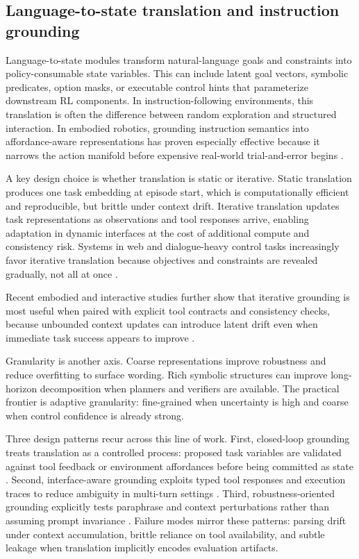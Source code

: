 ﻿\documentclass[conference]{IEEEtran}
\begin{document}
\subsection{Language-to-state translation and instruction grounding}
Language-to-state modules transform natural-language goals and constraints into policy-consumable state variables. This can include latent goal vectors, symbolic predicates, option masks, or executable control hints that parameterize downstream RL components. In instruction-following environments, this translation is often the difference between random exploration and structured interaction. In embodied robotics, grounding instruction semantics into affordance-aware representations has proven especially effective because it narrows the action manifold before expensive real-world trial-and-error begins \cite{arxiv_p_2204_01691,doi_p_10_1109_icra48891_2023_10160591,arxiv_p_2310_17722}.

A key design choice is whether translation is static or iterative. Static translation produces one task embedding at episode start, which is computationally efficient and reproducible, but brittle under context drift. Iterative translation updates task representations as observations and tool responses arrive, enabling adaptation in dynamic interfaces at the cost of additional compute and consistency risk. Systems in web and dialogue-heavy control tasks increasingly favor iterative translation because objectives and constraints are revealed gradually, not all at once \cite{arxiv_p_2311_00262,arxiv_p_2402_19446,arxiv_p_2601_02439}.

Recent embodied and interactive studies further show that iterative grounding is most useful when paired with explicit tool contracts and consistency checks, because unbounded context updates can introduce latent drift even when immediate task success appears to improve \cite{arxiv_p_2404_03648,arxiv_p_2511_14460,arxiv_p_2601_03555}.

Granularity is another axis. Coarse representations improve robustness and reduce overfitting to surface wording. Rich symbolic structures can improve long-horizon decomposition when planners and verifiers are available. The practical frontier is adaptive granularity: fine-grained when uncertainty is high and coarse when control confidence is already strong.

Three design patterns recur across this line of work. First, closed-loop grounding treats translation as a controlled process: proposed task variables are validated against tool feedback or environment affordances before being committed as state \cite{arxiv_p_2404_03648,arxiv_p_2601_03555,arxiv_p_2601_02439}. Second, interface-aware grounding exploits typed tool responses and execution traces to reduce ambiguity in multi-turn settings \cite{arxiv_p_2509_12867,arxiv_p_2509_14480,arxiv_p_2602_00528}. Third, robustness-oriented grounding explicitly tests paraphrase and context perturbations rather than assuming prompt invariance \cite{arxiv_p_2411_02337,arxiv_p_2510_16720,arxiv_p_2601_12762}. Failure modes mirror these patterns: parsing drift under context accumulation, brittle reliance on tool availability, and subtle leakage when translation implicitly encodes evaluation artifacts.
\end{document}
